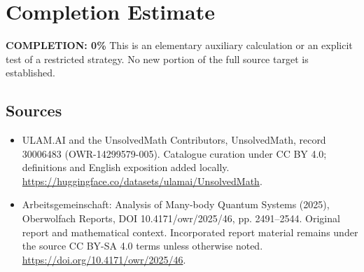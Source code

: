 \documentclass[11pt]{article}
\begin{document}
\section{Completion Estimate}
\noindent\textbf{COMPLETION: 0\%}
This is an elementary auxiliary calculation or an explicit test of a restricted strategy. No new portion of the full source target is established.

\subsection{Sources}
\begin{itemize}
\item[\hypertarget{source:30006483:1}{S1}] ULAM.AI and the UnsolvedMath Contributors, UnsolvedMath, record 30006483 (OWR-14299579-005). Catalogue curation under CC BY 4.0; definitions and English exposition added locally.
\url{https://huggingface.co/datasets/ulamai/UnsolvedMath}.
\item[\hypertarget{source:30006483:2}{S2}] Arbeitsgemeinschaft: Analysis of Many-body Quantum Systems (2025), Oberwolfach Reports, DOI 10.4171/owr/2025/46, pp. 2491--2544. Original report and mathematical context. Incorporated report material remains under the source CC BY-SA 4.0 terms unless otherwise noted.
\url{https://doi.org/10.4171/owr/2025/46}.
\end{itemize}
\label{end:30006483}
\end{document}

